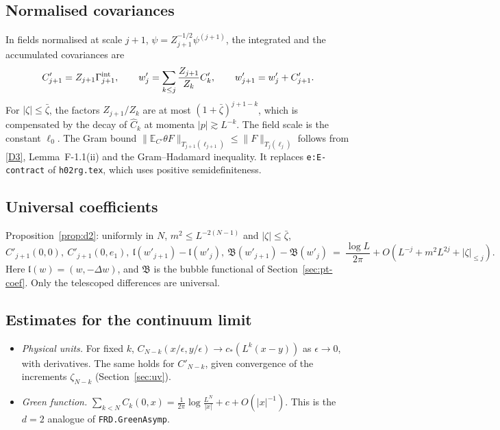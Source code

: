 \documentclass[11pt]{amsart}
\theoremstyle{definition}
\theoremstyle{remark}
\numberwithin{equation}{section}
\newcommand{\E}{\mathbb{E}}
\newcommand{\hr}{\texttt{h02rg.tex}}
\begin{document}
\subsection{Normalised covariances}
In fields normalised at scale $j+1$, $\psi=Z_{j+1}^{-1/2}\psi^{(j+1)}$, the integrated and the
accumulated covariances are
\begin{equation}\label{e:Cw}
  C'_{j+1}=Z_{j+1}\Gamma^{\rm int}_{j+1},\qquad
  w'_j=\sum_{k\le j}\frac{Z_{j+1}}{Z_k}C'_k,\qquad w'_{j+1}=w'_j+C'_{j+1}.
\end{equation}
For $|\zeta|\le\bar\zeta$, the factors $Z_{j+1}/Z_k$ are at most $(1+\bar\zeta)^{j+1-k}$, which
is compensated by the decay of $\hat C_k$ at momenta $|p|\gtrsim L^{-k}$. The field scale is the constant $\ell_0$. The Gram bound
$\|\E_{C'}\theta F\|_{T_{j+1}(\ell_{j+1})}\le\|F\|_{T_j(\ell_j)}$ follows from
\ref{D3}, Lemma~F-1.1(ii) and the Gram--Hadamard inequality. It replaces \texttt{e:E-contract}
of \hr{}, which uses positive semidefiniteness.

\subsection{Universal coefficients}
Proposition~\ref{prop:d2}: uniformly in $N$, $m^2\le L^{-2(N-1)}$ and $|\zeta|\le\bar\zeta$,
\begin{equation}\label{e:univ}
  C'_{j+1}(0,0),\ C'_{j+1}(0,e_1),\ \mathfrak l(w'_{j+1})-\mathfrak l(w'_j),\
  \mathfrak B(w'_{j+1})-\mathfrak B(w'_j)\ =\ \frac{\log L}{2\pi}+O(L^{-j}+m^2L^{2j}+|\zeta|_{\le j}).
\end{equation}
Here $\mathfrak l(w)=(w,-\Delta w)$, and $\mathfrak B$ is the bubble functional of
Section~\ref{sec:pt-coef}. Only the telescoped differences are universal.

\subsection{Estimates for the continuum limit}
\begin{itemize}
\item \emph{Physical units.} For fixed $k$, $C_{N-k}(x/\epsilon,y/\epsilon)\to c_*(L^k(x-y))$
  as $\epsilon\to0$, with derivatives. The same holds for $C'_{N-k}$, given convergence of the
  increments $\zeta_{N-k}$ (Section~\ref{sec:uv}).
\item \emph{Green function.} $\sum_{k<N}C_k(0,x)=\frac1{2\pi}\log\frac{L^N}{|x|}+c+O(|x|^{-1})$.
  This is the $d=2$ analogue of \texttt{FRD.GreenAsymp}.
\end{itemize}
\end{document}
